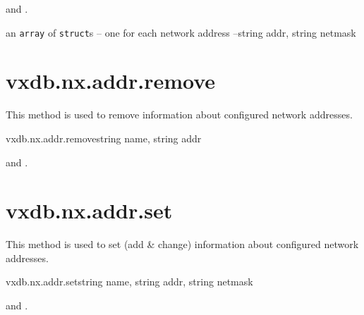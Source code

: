 \begin{rpcaccess}
 and \rpcownerchecks.
\end{rpcaccess}

\begin{rpcreturncomplex}{an \texttt{array} of \texttt{struct}s -- one for each
	network address --}{string addr, string netmask}
\end{rpcreturncomplex}

\rpcnoerrors


\section{vxdb.nx.addr.remove}

This method is used to remove information about configured network addresses.

\begin{rpcsynopsis}{vxdb.nx.addr.remove}{string name, string addr}
\end{rpcsynopsis}

\begin{rpcaccess}
 and \rpcownerchecks.
\end{rpcaccess}

\rpcreturnnil

\rpcnoerrors


\section{vxdb.nx.addr.set}

This method is used to set (add \& change) information about configured network
addresses.

\begin{rpcsynopsis}{vxdb.nx.addr.set}{string name, string addr, string netmask}
\end{rpcsynopsis}

\begin{rpcaccess}
 and \rpcownerchecks.
\end{rpcaccess}

